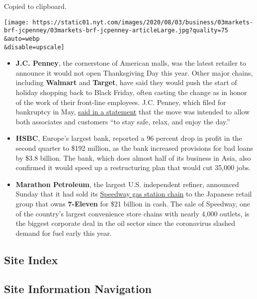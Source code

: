 Copied to clipboard.

\texttt{[image: https://static01.nyt.com/images/2020/08/03/business/03markets-brf-jcpenney/03markets-brf-jcpenney-articleLarge.jpg?quality=75\\\&auto=webp\\\&disable=upscale]}

\begin{itemize}
\item
  \textbf{J.C. Penney}, the cornerstone of American malls, was the
  latest retailer to announce it would not open Thanksgiving Day this
  year. Other major chains, including \textbf{Walmart} and
  \textbf{Target}, have said they would push the start of holiday
  shopping back to Black Friday, often casting the change as in honor of
  the work of their front-line employees. J.C. Penney, which filed for
  bankruptcy in May,
  \href{https://companyblog.jcpnewsroom.com/2020/08/03/jcpenney-to-close-stores-on-thanksgiving-day-2020/}{said
  in a statement} that the move was intended to allow both associates
  and customers ``to stay safe, relax, and enjoy the day.''
\item
  \textbf{HSBC}, Europe's largest bank, reported a 96 percent drop in
  profit in the second quarter to \$192 million, as the bank increased
  provisions for bad loans by \$3.8 billion. The bank, which does almost
  half of its business in Asia, also confirmed it would speed up a
  restructuring plan that would cut 35,000 jobs.
\item
  \textbf{Marathon Petroleum}, the largest U.S. independent refiner,
  announced Sunday that it had sold its
  \href{https://www.nytimes.com/2020/08/02/business/marathon-petroleum-speedway-7-11.html}{Speedway
  gas station chain} to the Japanese retail group that owns
  \textbf{7-Eleven} for \$21 billion in cash. The sale of Speedway, one
  of the country's largest convenience store chains with nearly 4,000
  outlets, is the biggest corporate deal in the oil sector since the
  coronavirus slashed demand for fuel early this year.
\end{itemize}

\hypertarget{site-index}{%
\subsection{Site Index}\label{site-index}}

\hypertarget{site-information-navigation}{%
\subsection{Site Information
Navigation}\label{site-information-navigation}}


